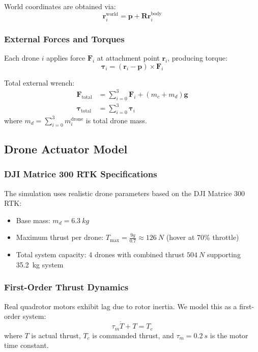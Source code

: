 \documentclass[12pt,a4paper]{article}
\begin{document}
World coordinates are obtained via:
\begin{equation}
    \mathbf{r}_i^{\text{world}} = \mathbf{p} + \mathbf{R}\mathbf{r}_i^{\text{body}}
    \label{eq:attachment_world}
\end{equation}

\subsubsection{External Forces and Torques}
Each drone $i$ applies force $\mathbf{F}_i$ at attachment point $\mathbf{r}_i$, producing torque:
\begin{equation}
    \boldsymbol{\tau}_i = (\mathbf{r}_i - \mathbf{p}) \times \mathbf{F}_i
    \label{eq:torque}
\end{equation}

Total external wrench:
\begin{align}
    \mathbf{F}_{\text{total}} &= \sum_{i=0}^{3} \mathbf{F}_i + (m_c + m_d)\mathbf{g} \\
    \boldsymbol{\tau}_{\text{total}} &= \sum_{i=0}^{3} \boldsymbol{\tau}_i
\end{align}
where $m_d = \sum_{i=0}^{3} m_i^{\text{drone}}$ is total drone mass.

\subsection{Drone Actuator Model}

\subsubsection{DJI Matrice 300 RTK Specifications}
The simulation uses realistic drone parameters based on the DJI Matrice 300 RTK:
\begin{itemize}
    \item Base mass: $m_d = \SI{6.3}{kg}$
    \item Maximum thrust per drone: $T_{\max} = \frac{9g}{0.7} \approx \SI{126}{N}$ (hover at 70\% throttle)
    \item Total system capacity: 4 drones with combined thrust $\SI{504}{N}$ supporting \SI{35.2}{kg} system
\end{itemize}

\subsubsection{First-Order Thrust Dynamics}
Real quadrotor motors exhibit lag due to rotor inertia. We model this as a first-order system:
\begin{equation}
    \tau_m \dot{T} + T = T_c
    \label{eq:motor_continuous}
\end{equation}
where $T$ is actual thrust, $T_c$ is commanded thrust, and $\tau_m = \SI{0.2}{s}$ is the motor time constant.
\end{document}
